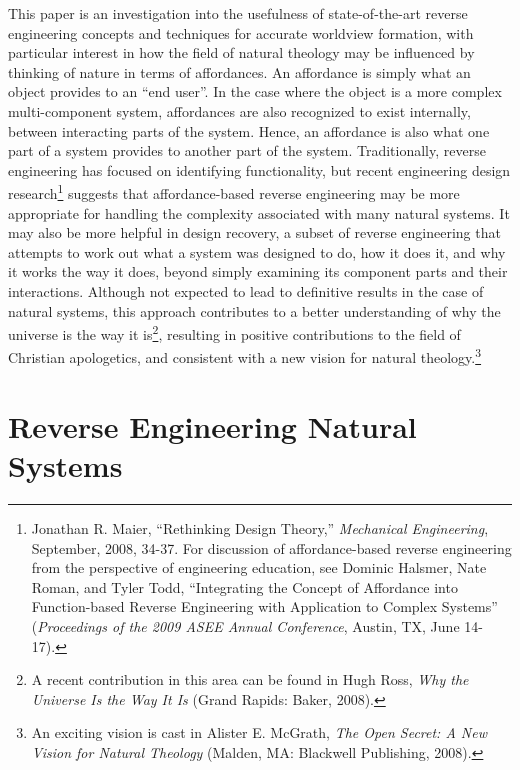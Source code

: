 This paper is an investigation into the usefulness of state-of-the-art
reverse engineering concepts and techniques for accurate worldview
formation, with particular interest in how the field of natural
theology may be influenced by thinking of nature in terms of
affordances. An affordance is simply what an object provides to an “end
user”. In the case where the object is a more complex multi-component
system, affordances are also recognized to exist internally, between
interacting parts of the system. Hence, an affordance is also what one
part of a system provides to another part of the system. Traditionally,
reverse engineering has focused on identifying functionality, but
recent engineering design research\footnote{
Jonathan R. Maier, “Rethinking Design Theory,”
\textit{Mechanical Engineering},\textit{ }September, 2008, 34-37. For
discussion of affordance-based reverse engineering from the perspective
of engineering education, see Dominic Halsmer, Nate Roman, and Tyler
Todd, “Integrating the Concept of Affordance into Function-based
Reverse Engineering with Application to Complex Systems”
(\textit{Proceedings of the 2009 ASEE Annual Conference}, Austin, TX,
June 14-17).
} suggests that
affordance-based reverse engineering may be more appropriate for
handling the complexity associated with many natural systems. It may
also be more helpful in design recovery, a subset of reverse
engineering that attempts to work out what a system was designed to do,
how it does it, and why it works the way it does, beyond simply
examining its component parts and their interactions. Although not
expected to lead to definitive results in the case of natural systems,
this approach contributes to a better understanding of why the universe
is the way it is\footnote{
A recent contribution in this area can be found in
Hugh Ross, \textit{Why the Universe Is the Way It Is} (Grand Rapids:
Baker, 2008).
}, resulting in positive
contributions to the field of Christian apologetics, and consistent
with a new vision for natural theology.\footnote{
An exciting vision is cast in Alister E. McGrath,
\textit{The Open Secret: A New Vision for Natural Theology} (Malden,
MA: Blackwell Publishing, 2008).
}

\section{Reverse Engineering Natural Systems}

